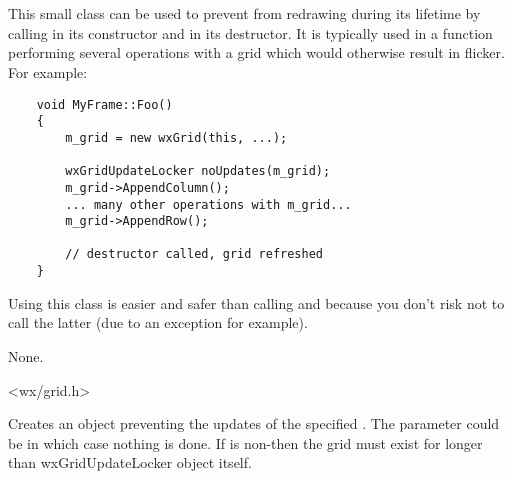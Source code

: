 
\section{}\label{wxgridupdatelocker}

This small class can be used to prevent  from redrawing
during its lifetime by calling 
in its constructor and  in its
destructor. It is typically used in a function performing several operations
with a grid which would otherwise result in flicker. For example:

{\small
\begin{verbatim}
    void MyFrame::Foo()
    {
        m_grid = new wxGrid(this, ...);

        wxGridUpdateLocker noUpdates(m_grid);
        m_grid->AppendColumn();
        ... many other operations with m_grid...
        m_grid->AppendRow();

        // destructor called, grid refreshed
    }
\end{verbatim}
}

Using this class is easier and safer than calling 
 and 
because you don't risk not to call the latter (due to an exception for example).


None.


<wx/grid.h>






\label{wxgridupdatelockerctor}


Creates an object preventing the updates of the specified . The
parameter could be \NULL in which case nothing is done. If  is
non-\NULL then the grid must exist for longer than wxGridUpdateLocker object
itself.

